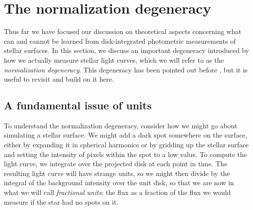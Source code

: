 \documentclass[modern,linenumbers]{aastex62}
\begin{document}
\section{The normalization degeneracy}
\label{sec:normalization}

Thus far we have focused our discussion on theoretical aspects concerning
what can and cannot be learned from disk-integrated photometric measurements
of stellar surfaces. In this section, we discuss an important degeneracy
introduced by how we actually measure stellar light curves, which we
will refer to as the \emph{normalization degeneracy}. This degeneracy has been
pointed out before \citep[e.g.,][]{Basri2018}, but it is useful to revisit and
build on it here.

\subsection{A fundamental issue of units}
%
To understand the normalization degeneracy, consider how we might go about simulating
a stellar surface.
%
We might add a dark spot somewhere on the surface, either by expanding
it in spherical harmonics or by gridding up the stellar surface and
setting the intensity of pixels within the spot to a low value. To compute
the light curve, we integrate over the
projected disk at each point in time.
The resulting
light curve will have strange units, so we might then divide by the
integral of the background intensity over the unit disk, so that we are
now in what we will call \emph{fractional units}: the flux as a
fraction of the flux we would measure if the star had no spots on it.
\end{document}
